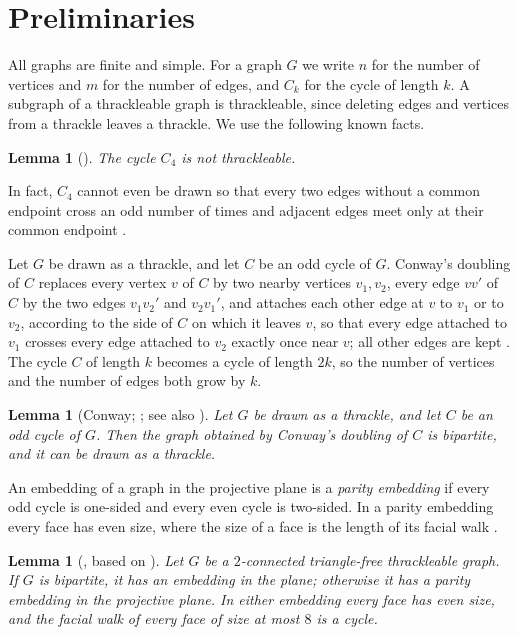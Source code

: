 \documentclass[11pt]{amsart}
\newtheorem{lemma}[theorem]{Lemma}
\theoremstyle{definition}
\theoremstyle{remark}
\numberwithin{equation}{section}
\begin{document}
\section{Preliminaries}\label{sec:prelim}

All graphs are finite and simple. For a graph $G$ we write $n$ for the number of vertices and $m$ for the number of edges, and $C_k$ for the cycle of length $k$. A subgraph of a thrackleable graph is thrackleable, since deleting edges and vertices from a thrackle leaves a thrackle. We use the following known facts.

\begin{lemma}[{\cite[Lemma~4]{FP19}}]\label{lem:c4}
The cycle $C_4$ is not thrackleable.
\end{lemma}

In fact, $C_4$ cannot even be drawn so that every two edges without a common endpoint cross an odd number of times and adjacent edges meet only at their common endpoint \cite[Lemma~4 and Section~5]{FP19}.

Let $G$ be drawn as a thrackle, and let $C$ be an odd cycle of $G$. Conway's doubling of $C$ replaces every vertex $v$ of $C$ by two nearby vertices $v_1,v_2$, every edge $vv'$ of $C$ by the two edges $v_1v_2'$ and $v_2v_1'$, and attaches each other edge at $v$ to $v_1$ or to $v_2$, according to the side of $C$ on which it leaves $v$, so that every edge attached to $v_1$ crosses every edge attached to $v_2$ exactly once near $v$; all other edges are kept \cite[Section~2]{FP11}. The cycle $C$ of length $k$ becomes a cycle of length $2k$, so the number of vertices and the number of edges both grow by $k$.

\begin{lemma}[Conway; {\cite[Lemma~5]{FP11}}; see also {\cite[Lemma~2]{CN00}}]\label{lem:double}
Let $G$ be drawn as a thrackle, and let $C$ be an odd cycle of $G$. Then the graph obtained by Conway's doubling of $C$ is bipartite, and it can be drawn as a thrackle.
\end{lemma}

An embedding of a graph in the projective plane is a \emph{parity embedding} if every odd cycle is one-sided and every even cycle is two-sided. In a parity embedding every face has even size, where the size of a face is the length of its facial walk \cite[Section~2]{FP19}.

\begin{lemma}[{\cite[Corollary~1 and Proposition~1]{FP19}}, based on \cite{LPS97,CN09}]\label{lem:embed}
Let $G$ be a $2$-connected triangle-free thrackleable graph. If $G$ is bipartite, it has an embedding in the plane; otherwise it has a parity embedding in the projective plane. In either embedding every face has even size, and the facial walk of every face of size at most $8$ is a cycle.
\end{lemma}
\end{document}
